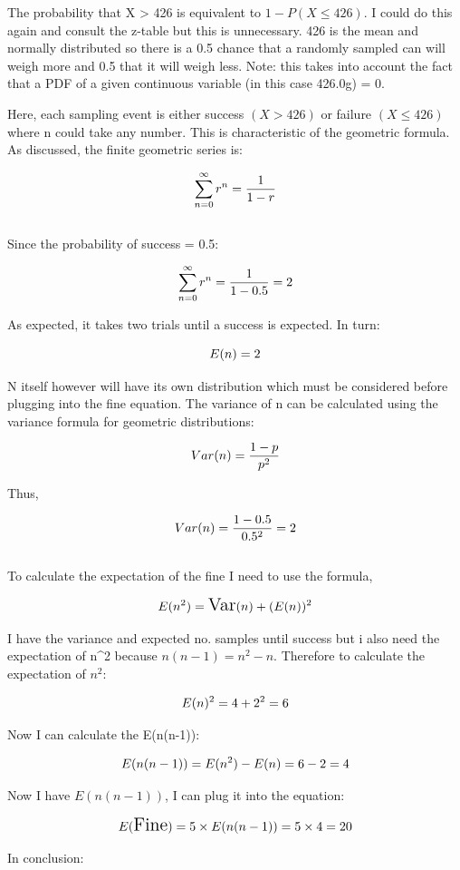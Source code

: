 \documentclass[
]{article}
\begin{document}
The probability that X \textgreater{} 426 is equivalent to
\(1- P(X ≤ 426)\). I could do this again and consult the z-table but
this is unnecessary. 426 is the mean and normally distributed so there
is a 0.5 chance that a randomly sampled can will weigh more and 0.5 that
it will weigh less. Note: this takes into account the fact that a PDF of
a given continuous variable (in this case 426.0g) = 0.

Here, each sampling event is either success \((X > 426)\) or failure
\((X ≤ 426)\) where n could take any number. This is characteristic of
the geometric formula. As discussed, the finite geometric series is:

\[
\Large 
\sum_{n=0}^{\infty}r^n=\frac{1}{1-r} 
\]\\

Since the probability of success = 0.5:

\[
\Large
\sum_{n=0}^{\infty}r^n=\frac{1}{1-0.5}  = 2
\]

As expected, it takes two trials until a success is expected. In turn:

\[
\Large
E(n) = 2
\]

N itself however will have its own distribution which must be considered
before plugging into the fine equation. The variance of n can be
calculated using the variance formula for geometric distributions:

\[
\Large
Var(n) = \frac{1-p}{p^2}
\]

Thus,

\[
\Large
Var(n) = \frac{1-0.5}{0.5^2}= 2
\]\\

To calculate the expectation of the fine I need to use the formula,

\[
\Large
E(n^2) = \text{Var}(n) + (E(n))^2
\]

I have the variance and expected no. samples until success but i also
need the expectation of n\^{}2 because \(n(n−1)=n^2−n\). Therefore to
calculate the expectation of \(n^2\):

\[
\Large
E(n)^2 = 4 + 2^2 = 6
\]

Now I can calculate the E(n(n-1)):

\[
\Large
E(n(n-1))=  E(n^2) - E(n) = 6-2 = 4
\]

Now I have \(E(n(n-1))\), I can plug it into the equation:

\[
\Large
E(\text{Fine}) = 5\times{}E(n(n-1))=  5 \times 4 = 20
\]

In conclusion:
\end{document}
